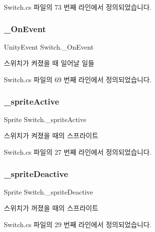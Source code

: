 Switch.\+cs 파일의 73 번째 라인에서 정의되었습니다.

\mbox{\label{class_switch_a8485f562cae8388cc00614d3d0327405}} 
\subsubsection{\texorpdfstring{\_OnEvent}{\_OnEvent}}
{\footnotesize\ttfamily Unity\+Event Switch.\+\_\+\+On\+Event}



스위치가 켜졌을 때 일어날 일들 



Switch.\+cs 파일의 69 번째 라인에서 정의되었습니다.

\mbox{\label{class_switch_afa73947391c220a1a6649ebfde9b3f29}} 
\subsubsection{\texorpdfstring{\_spriteActive}{\_spriteActive}}
{\footnotesize\ttfamily Sprite Switch.\+\_\+sprite\+Active}



스위치가 켜졌을 때의 스프라이트 



Switch.\+cs 파일의 27 번째 라인에서 정의되었습니다.

\mbox{\label{class_switch_a07fa9da72f21c271622813fe9fafa40f}} 
\subsubsection{\texorpdfstring{\_spriteDeactive}{\_spriteDeactive}}
{\footnotesize\ttfamily Sprite Switch.\+\_\+sprite\+Deactive}



스위치가 꺼졌을 때의 스프라이트 



Switch.\+cs 파일의 29 번째 라인에서 정의되었습니다.

\mbox{\label{class_switch_ad88a45b17c0618e096db2eede7eebd72}} 

